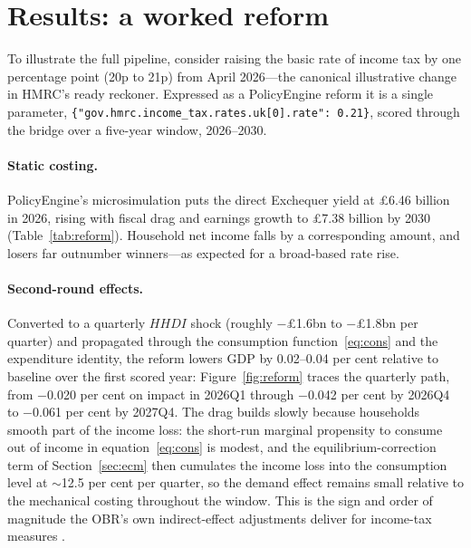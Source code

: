 \section{Results: a worked reform}
\label{sec:results}

To illustrate the full pipeline, consider raising the basic rate of income tax by one percentage point (20p to 21p) from April 2026---the canonical illustrative change in HMRC's ready reckoner. Expressed as a PolicyEngine reform it is a single parameter, \texttt{\{"gov.hmrc.\allowbreak income\_tax.\allowbreak rates.\allowbreak uk[0].\allowbreak rate":\allowbreak\ 0.21\}}, scored through the bridge over a five-year window, 2026--2030.

\paragraph{Static costing.} PolicyEngine's microsimulation puts the direct Exchequer yield at \pounds 6.46 billion in 2026, rising with fiscal drag and earnings growth to \pounds 7.38 billion by 2030 (Table~\ref{tab:reform}). Household net income falls by a corresponding amount, and losers far outnumber winners---as expected for a broad-based rate rise.

\paragraph{Second-round effects.} Converted to a quarterly $HHDI$ shock (roughly $-$\pounds 1.6bn to $-$\pounds 1.8bn per quarter) and propagated through the consumption function~\eqref{eq:cons} and the expenditure identity, the reform lowers GDP by 0.02--0.04 per cent relative to baseline over the first scored year: Figure~\ref{fig:reform} traces the quarterly path, from $-$0.020 per cent on impact in 2026Q1 through $-$0.042 per cent by 2026Q4 to $-$0.061 per cent by 2027Q4. The drag builds slowly because households smooth part of the income loss: the short-run marginal propensity to consume out of income in equation~\eqref{eq:cons} is modest, and the equilibrium-correction term of Section~\ref{sec:ecm} then cumulates the income loss into the consumption level at $\sim$12.5 per cent per quarter, so the demand effect remains small relative to the mechanical costing throughout the window. This is the sign and order of magnitude the OBR's own indirect-effect adjustments deliver for income-tax measures \citep{obr2014costings}.

